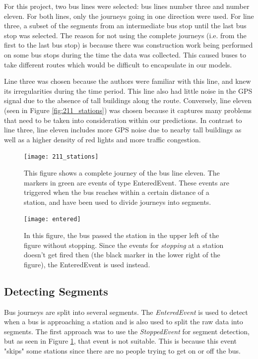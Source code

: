 For this project, two bus lines were selected: bus lines number three and number eleven. For both lines, only the journeys going in one direction were used. For line three, a subset of the segments from an intermediate bus stop until the last bus stop was selected. The reason for not using the complete journeys (i.e. from the first to the last bus stop) is because there was construction work being performed on some bus stops during the time the data was collected. This caused buses to take different routes which would be difficult to encapsulate in our models.

Line three was chosen because the authors were familiar with this line, and knew its irregularities during the time period. This line also had little noise in the GPS signal due to the absence of tall buildings along the route. Conversely, line eleven (seen in Figure \ref{fig:211_stations}) was chosen because it captures many problems that need to be taken into consideration within our predictions.  In contrast to line three, line eleven includes more GPS noise due to nearby tall buildings as well as a higher density of red lights and more traffic congestion.

\begin{figure}[!b]
\begin{minipage}{.5\textwidth}
    \texttt{[image: 211\_stations]}
    \caption{This figure shows a complete journey of the bus line eleven. The markers in green are events of type EnteredEvent. These events are triggered when the bus reaches within a certain distance of a station, and have been used to divide journeys into segments.}
    \label{fig:211_stations}
\end{minipage}
\hspace{5pt}
\begin{minipage}{.48\textwidth}
\texttt{[image: entered]}
\caption{In this figure, the bus passed the station in the upper left of the figure without stopping. Since the events for \textit{stopping} at a station doesn't get fired then (the black marker in the lower right of the figure), the EnteredEvent is used instead.}
\label{fig:entered}
\end{minipage}
\end{figure}


\subsection{Detecting Segments}
Bus journeys are split into several segments. The \textit{EnteredEvent} is used to detect when a bus is approaching a station and is also used to split the raw data into segments. The first approach was to use the \textit{StoppedEvent} for segment detection, but as seen in Figure \ref{fig:entered}, that event is not suitable. This is because this event "skips" some stations since there are no people trying to get on or off the bus.

